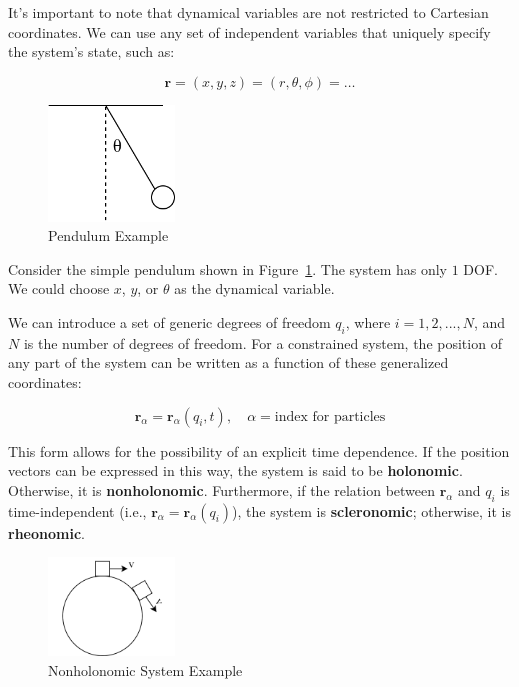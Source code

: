 It's important to note that dynamical variables are not restricted to Cartesian 
coordinates. We can use any set of independent variables that uniquely specify the 
system's state, such as:

\begin{equation}
    \mathbf{r} = (x, y, z) = (r, \theta, \phi) = \dots
\end{equation}

\begin{figure}[ht]
    \centering
    \includegraphics[width=0.3\textwidth]{images/1-1-2.png}
    \caption{Pendulum Example}
    \label{fig:1-1-2}
\end{figure}

Consider the simple pendulum shown in Figure~\ref{fig:1-1-2}. The system has only $1$ DOF.
We could choose $x$, $y$, or $\theta$ as the dynamical variable. 

We can introduce a set of generic degrees of freedom $q_i$, where $i = 1, 2, ..., N$, and 
$N$ is the number of degrees of freedom. For a constrained system, the position of any 
part of the system can be written as a function of these generalized coordinates:

\begin{equation}
    \mathbf{r}_\alpha = \mathbf{r}_\alpha(q_i, t), \quad \alpha = \text{index for particles}
\end{equation}

This form allows for the possibility of an explicit time dependence. If the position 
vectors can be expressed in this way, the system is said to be \textbf{holonomic}. 
Otherwise, it is  \textbf{nonholonomic}. Furthermore, if the relation between
 $\mathbf{r}_\alpha$ and $q_i$ is time-independent (i.e., 
 $\mathbf{r}_\alpha = \mathbf{r}_\alpha(q_i)$), the system is \textbf{scleronomic}; 
 otherwise, it is \textbf{rheonomic}.

\begin{figure}[ht]
    \centering
    \includegraphics[width=0.3\textwidth]{images/1-1-3.png}
    \caption{Nonholonomic System Example}
    \label{fig:1-1-3}
\end{figure}

